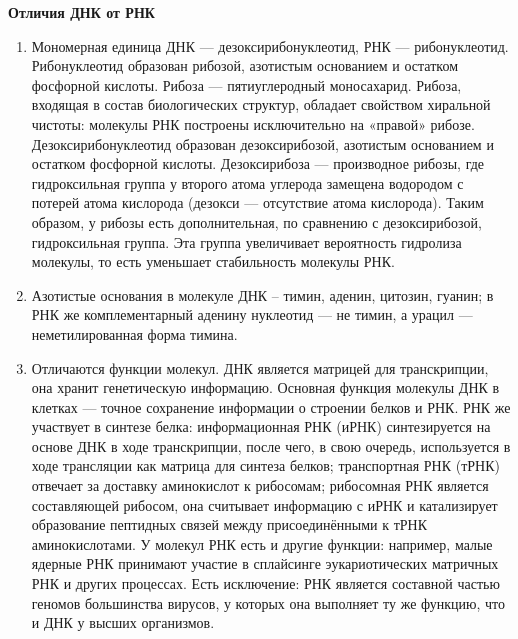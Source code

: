 \documentclass[a4paper,14pt]{article}
\begin{document}
\begin{center}
	\LARGE{\textbf{Отличия ДНК от РНК}}\\
\end{center}

\begin{enumerate}
\item Мономерная единица ДНК --- дезоксирибонуклеотид, РНК --- рибонуклеотид.
\newline
Рибонуклеотид образован рибозой, азотистым основанием и остатком фосфорной кислоты. Рибоза --- пятиуглеродный моносахарид. Рибоза, входящая в состав биологических структур, обладает свойством хиральной чистоты: молекулы РНК построены исключительно на «правой» рибозе.
\newline
Дезоксирибонуклеотид образован дезоксирибозой, азотистым основанием и остатком фосфорной кислоты. Дезоксирибоза --- производное рибозы, где гидроксильная группа у второго атома углерода замещена водородом с потерей атома кислорода (дезокси --- отсутствие атома кислорода).
\newline
Таким образом, у рибозы есть дополнительная, по сравнению с дезоксирибозой, гидроксильная группа. Эта группа увеличивает вероятность гидролиза молекулы, то есть уменьшает стабильность молекулы РНК.

\item Азотистые основания в молекуле ДНК – тимин, аденин, цитозин, гуанин; в РНК же комплементарный аденину нуклеотид --- не тимин, а урацил --- неметилированная форма тимина.

\item Отличаются функции молекул. ДНК является матрицей для транскрипции, она хранит генетическую информацию. Основная функция молекулы ДНК в клетках --- точное сохранение информации о строении белков и РНК. РНК же участвует в синтезе белка: информационная РНК (иРНК) синтезируется на основе ДНК в ходе транскрипции, после чего, в свою очередь, используется в ходе трансляции как матрица для синтеза белков; транспортная РНК (тРНК) отвечает за доставку аминокислот к рибосомам; рибосомная РНК является составляющей рибосом, она считывает информацию с иРНК и катализирует образование пептидных связей между присоединёнными к тРНК аминокислотами. У молекул РНК есть и другие функции: например, малые ядерные РНК принимают участие в сплайсинге эукариотических матричных РНК и других процессах. 
\newline
Есть исключение: РНК является составной частью геномов большинства вирусов, у которых она выполняет ту же функцию, что и ДНК у высших организмов.


\end{enumerate}
\end{document}
